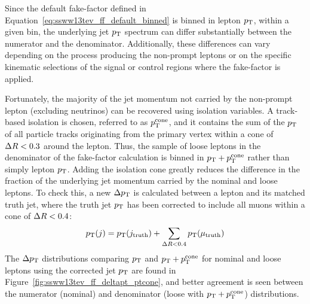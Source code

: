 Since the default fake-factor defined in Equation~\ref{eq:ssww13tev_ff_default_binned} is binned in lepton $p_{\mathrm{T}}$, within a given bin, the underlying jet $p_{\mathrm{T}}$ spectrum can differ substantially between the numerator and the denominator.
Additionally, these differences can vary depending on the process producing the non-prompt leptons or on the specific kinematic selections of the signal or control regions where the fake-factor is applied.

Fortunately, the majority of the jet momentum not carried by the non-prompt lepton (excluding neutrinos) can be recovered using isolation variables.
A track-based isolation is chosen, referred to as $p_{\mathrm{T}}^{\textrm{cone}}$, and it contains the sum of the $p_{\mathrm{T}}$ of all particle tracks originating from the primary vertex within a cone of $\Delta R < 0.3$ around the lepton.
Thus, the sample of loose leptons in the denominator of the fake-factor calculation is binned in $p_{\mathrm{T}}+p_{\mathrm{T}}^{\textrm{cone}}$ rather than simply lepton $p_{\mathrm{T}}$.
Adding the isolation cone greatly reduces the difference in the fraction of the underlying jet momentum carried by the nominal and loose leptons.
To check this, a new $\Delta p_{\mathrm{T}}$ is calculated between a lepton and its matched truth jet, where the truth jet $p_{\mathrm{T}}$ has been corrected to include all muons within a cone of $\Delta R < 0.4$:
\begin{equation}
\pt(j) = \pt(j_{\textrm{truth}})+\sum\limits_{\deltar < 0.4}\pt(\mu_{\textrm{truth}})
\label{eq:ssww13tev_ff_jet_corr}
\end{equation}
The $\Delta p_{\mathrm{T}}$ distributions comparing $p_{\mathrm{T}}$ and $p_{\mathrm{T}}+p_{\mathrm{T}}^{\textrm{cone}}$ for nominal and loose leptons using the corrected jet $p_{\mathrm{T}}$ are found in Figure~\ref{fig:ssww13tev_ff_deltapt_ptcone}, and better agreement is seen between the numerator (nominal) and denominator (loose with $p_{\mathrm{T}}+p_{\mathrm{T}}^{\textrm{cone}}$) distributions.

